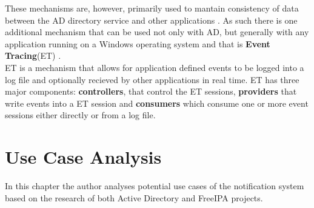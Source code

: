 These mechanisms are, however, primarily used to mantain consistency of data between the AD directory service and other applications \cite{ADtrack}.
As such there is one additional mechanism that can be used not only with AD, but generally with any application running on a Windows operating system and that is \textbf{Event Tracing}(ET) \cite{ADtrace}. \\
ET is a mechanism that allows for application defined events to be logged into a log file and optionally recieved by other applications in real time.
ET has three major components:%
\textbf{controllers}, that control the ET sessions, \textbf{providers} that write events into a ET session and \textbf{consumers} which consume one or more event sessions either directly or from a log file.


\chapter{Use Case Analysis}
\label{chp:anal}
In this chapter the author analyses potential use cases of the notification system based on the research of both Active Directory and FreeIPA projects.

